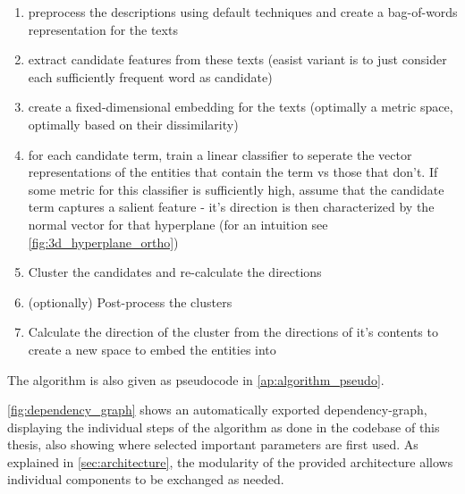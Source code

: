 \label{sec:algorithmsteps}
\begin{enumerate}
	\item[\saveref{sec:algo_preproc}{1.}] preprocess the descriptions using default techniques and create a bag-of-words representation for the texts
	\item[\saveref{sec:extract_cands}{2.}] extract candidate features from these texts (easist variant is to just consider each sufficiently frequent word as candidate)
	\item[\saveref{sec:generate_vectorspaces}{3.}] create a fixed-dimensional embedding for the texts (optimally a metric space, optimally based on their dissimilarity)
	\item[\saveref{sec:svm_filter_cands}{4.}] for each candidate term, train a linear classifier to seperate the vector representations of the entities that contain the term vs those that don't. If some metric for this classifier is sufficiently high, assume that the candidate term captures a salient feature - it's direction is then characterized by the normal vector for that hyperplane (for an intuition see \ref{fig:3d_hyperplane_ortho})
	\item[\saveref{sec:generate_vectorspaces}{5.}] Cluster the candidates and re-calculate the directions
	\item[\saveref{sec:generate_vectorspaces}{6.}] (optionally) Post-process the clusters 
	\item[\saveref{sec:generate_vectorspaces}{7.}] Calculate the direction of the cluster from the directions of it's contents to create a new space to embed the entities into
\end{enumerate}

The algorithm is also given as pseudocode in \autoref{ap:algorithm_pseudo}.


\autoref{fig:dependency_graph} shows an automatically exported dependency-graph, displaying the individual steps of the algorithm as done in the codebase of this thesis, also showing where selected important parameters are first used. As explained in \autoref{sec:architecture}, the modularity of the provided architecture allows individual components to be exchanged as needed.


